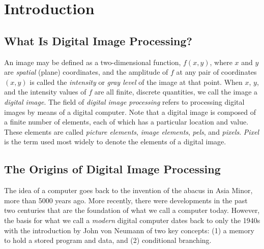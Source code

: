 \documentclass[12pt,a4paper,twoside,openany]{book}
\begin{document}

\restoregeometry
\thispagestyle{empty}
\setcounter{page}{0}
\tableofcontents
\thispagestyle{empty}
\setcounter{page}{0}


\chapter{Introduction}
\section{What Is Digital Image Processing?}

An image may be defined as a two-dimensional function, $f(x,y)$, where $x$ and $y$ are \textit{spatial} (plane) coordinates, and the amplitude of $f$ at any pair of coordinates $(x,y)$ is called the \textit{intensity} or \textit{gray level} of the image at that point. When $x$, $y$, and the intensity values of $f$ are all finite, discrete quantities, we call the image a \textit{digital image}. The field of \textit{digital image processing} refers to processing digital images by means of a digital computer. Note that a digital image is composed of a finite number of elements, each of which has a particular location and value. These elements are called \textit{picture elements}, \textit{image elements}, \textit{pels}, and \textit{pixels}. \textit{Pixel} is the term used most widely to denote the elements of a digital image.

\section{The Origins of Digital Image Processing}

The idea of a computer goes back to the invention of the abacus in Asia Minor, more than 5000 years ago. More recently, there were developments in the past two centuries that are the foundation of what we call a computer today. However, the basis for what we call a \textit{modern} digital computer dates back to only the 1940s with the introduction by John von Neumann of two key concepts: (1) a memory to hold a stored program and data, and (2) conditional branching.
\end{document}
